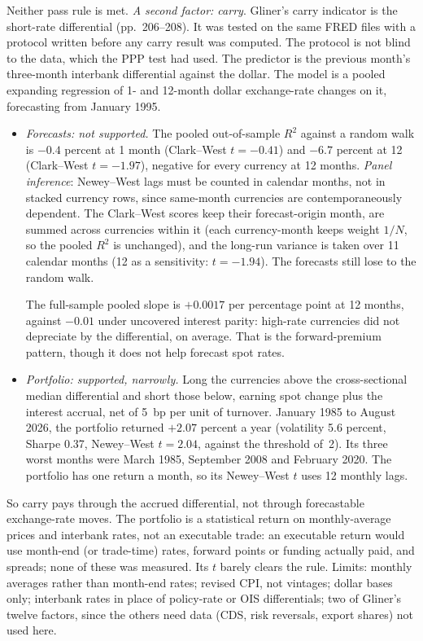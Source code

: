 \begin{qfmethod}
\begin{itemize}
\end{itemize}
Neither pass rule is met. \emph{A second factor: carry}. Gliner's carry indicator is the short-rate differential (pp.~206--208). It was tested on the same FRED files with a protocol written before any carry result was computed. The protocol is not blind to the data, which the PPP test had used. The predictor is the previous month's three-month interbank differential against the dollar. The model is a pooled expanding regression of 1- and 12-month dollar exchange-rate changes on it, forecasting from January 1995.
\begin{itemize}
\item \emph{Forecasts: not supported.} The pooled out-of-sample $R^2$ against a random walk is $-0.4$ percent at 1 month (Clark--West $t=-0.41$) and $-6.7$ percent at 12 (Clark--West $t=-1.97$), negative for every currency at 12 months. \emph{Panel inference}: Newey--West lags must be counted in calendar months, not in stacked currency rows, since same-month currencies are contemporaneously dependent. The Clark--West scores keep their forecast-origin month, are summed across currencies within it (each currency-month keeps weight $1/N$, so the pooled $R^2$ is unchanged), and the long-run variance is taken over 11 calendar months (12 as a sensitivity: $t=-1.94$). The forecasts still lose to the random walk.

The full-sample pooled slope is $+0.0017$ per percentage point at 12 months, against $-0.01$ under uncovered interest parity: high-rate currencies did not depreciate by the differential, on average. That is the forward-premium pattern, though it does not help forecast spot rates.
\item \emph{Portfolio: supported, narrowly.} Long the currencies above the cross-sectional median differential and short those below, earning spot change plus the interest accrual, net of 5~bp per unit of turnover. January 1985 to August 2026, the portfolio returned $+2.07$ percent a year (volatility 5.6 percent, Sharpe 0.37, Newey--West $t=2.04$, against the threshold of~2). Its three worst months were March 1985, September 2008 and February 2020. The portfolio has one return a month, so its Newey--West $t$ uses 12 monthly lags.
\end{itemize}
So carry pays through the accrued differential, not through forecastable exchange-rate moves. The portfolio is a statistical return on monthly-average prices and interbank rates, not an executable trade: an executable return would use month-end (or trade-time) rates, forward points or funding actually paid, and spreads; none of these was measured. Its $t$ barely clears the rule. Limits: monthly averages rather than month-end rates; revised CPI, not vintages; dollar bases only; interbank rates in place of policy-rate or OIS differentials; two of Gliner's twelve factors, since the others need data (CDS, risk reversals, export shares) not used here.


\end{qfmethod}
